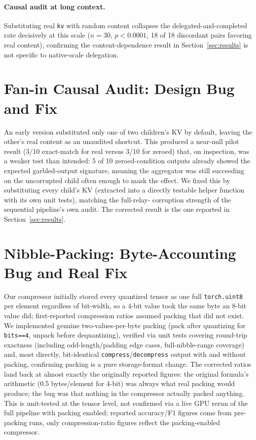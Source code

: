 \documentclass[11pt]{article}
\begin{document}
\paragraph{Causal audit at long context.} Substituting real \texttt{kv}
with random content collapses the delegated-and-completed rate
decisively at this scale ($n=30$, $p<0.0001$, 18 of 18 discordant
pairs favoring real content), confirming the content-dependence result
in Section~\ref{sec:results} is not specific to native-scale
delegation.

\section{Fan-in Causal Audit: Design Bug and Fix}
\label{app:faninbug}

An early version substituted only one of two children's KV by default,
leaving the other's real content as an unaudited shortcut. This
produced a near-null pilot result (3/10 exact-match for real versus
3/10 for zeroed) that, on inspection, was a weaker test than intended:
5 of 10 zeroed-condition outputs already showed the expected
garbled-output signature, meaning the aggregator was still succeeding
on the uncorrupted child often enough to mask the effect. We fixed this
by substituting every child's KV (extracted into a directly testable
helper function with its own unit tests), matching the full-relay-
corruption strength of the sequential pipeline's own audit. The
corrected result is the one reported in Section~\ref{sec:results}.

\section{Nibble-Packing: Byte-Accounting Bug and Real Fix}
\label{app:nibble}

Our compressor initially stored every quantized tensor as one full
\texttt{torch.uint8} per element regardless of bit-width, so a 4-bit
value took the same byte an 8-bit value did; first-reported compression
ratios assumed packing that did not exist. We implemented genuine
two-values-per-byte packing (pack after quantizing for \texttt{bits==4},
unpack before dequantizing), verified via unit tests covering
round-trip exactness (including odd-length/padding edge cases,
full-nibble-range coverage) and, most directly, bit-identical
\texttt{compress}/\texttt{decompress} output with and without packing,
confirming packing is a pure storage-format change. The corrected
ratios land back at almost exactly the originally reported figures: the
original formula's arithmetic (0.5 bytes/element for 4-bit) was always
what real packing would produce; the bug was that nothing in the
compressor actually packed anything. This is unit-tested at the tensor
level, not confirmed via a live GPU rerun of the full pipeline with
packing enabled; reported accuracy/F1 figures come from pre-packing
runs, only compression-ratio figures reflect the packing-enabled
compressor.
\end{document}
